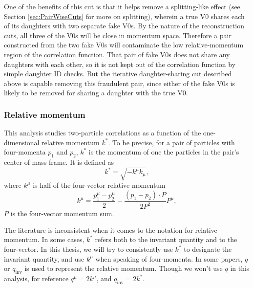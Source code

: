
One of the benefits of this cut is that it helps remove a splitting-like effect (see Section \ref{sec:PairWiseCuts} for more on splitting), wherein a true V0 shares each of its daughters with two separate fake V0s.  
By the nature of the reconstruction cuts, all three of the V0s will be close in momentum space.  
Therefore a pair constructed from the two fake V0s will contaminate the low relative-momentum region of the correlation function.  
That pair of fake V0s does not share any daughters with each other, so it is not kept out of the correlation function by simple daughter ID checks.  
But the iterative daughter-sharing cut described above is capable removing this fraudulent pair, since either of the fake V0s is likely to be removed for sharing a daughter with the true V0.

\subsubsection{Relative momentum}
\label{sec:RelativeMomentum}

This analysis studies two-particle correlations as a function of the one-dimensional relative momentum $k^*$.
To be precise, for a pair of particles with four-momenta $p_1$ and $p_2$, $k^*$ is the momentum of one the particles in the pair's center of mass frame.
It is defined as
\begin{equation}
\label{eq:kstar}
k^*= \sqrt{-k^\mu k_\mu},
\end{equation}
where $k^\mu$ is half of the four-vector relative momentum
\begin{equation}
\label{eq:kmu}
k^\mu = \frac{p_1^\mu - p_2^\mu}{2} -\frac{(p_1 - p_2)\cdot P}{2P^2}P^\mu,
\end{equation}
$P$ is the four-vector momentum sum.

The literature is inconsistent when it comes to the notation for relative momentum.
In some cases, $k^*$ refers both to the invariant quantity and to the four-vector.
In this thesis, we will try to consistently use $k^*$ to designate the invariant quantity, and use $k^\mu$ when speaking of four-momenta.
In some papers, $q$ or $q_{\mathrm{inv}}$ is used to represent the relative momentum.
Though we won't use $q$ in this analysis, for reference
$q^\mu = 2k^\mu$, and $q_{\mathrm{inv}} = 2 k^*$.


